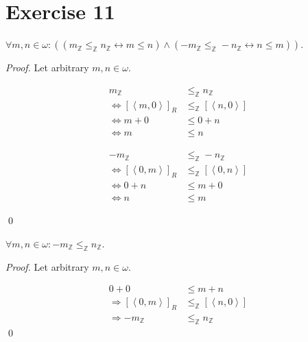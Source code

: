 \documentclass[11pt]{llncs}
\begin{document}
\section*{Exercise 11}
\begin{lemma}
  $\forall m, n \in \omega:
  ((m_{\mathbb{Z}} \leq_{\mathbb{Z}} n_{\mathbb{Z}} \leftrightarrow m \leq n)
   \land
  (-m_{\mathbb{Z}} \leq_{\mathbb{Z}} -n_{\mathbb{Z}} \leftrightarrow n \leq m))$.
\end{lemma}
\begin{proof}
  Let arbitrary $m, n \in \omega$.

  \begin{minipage}[t]{0.49\textwidth}
    \begin{align*}
                      m_{\mathbb{Z}} &\leq_{\mathbb{Z}} n_{\mathbb{Z}}\\
      \Leftrightarrow [\left<m, 0\right>]_R &\leq_{\mathbb{Z}} [\left<n, 0\right>]\\
      \Leftrightarrow m + 0 &\leq 0 + n\\
      \Leftrightarrow m &\leq n
    \end{align*}
  \end{minipage}
  \textwidth
  \vline
  \textwidth
  \begin{minipage}[t]{0.49\textwidth}
    \begin{align*}
                      -m_{\mathbb{Z}} &\leq_{\mathbb{Z}} -n_{\mathbb{Z}}\\
      \Leftrightarrow [\left<0, m\right>]_R &\leq_{\mathbb{Z}} [\left<0, n\right>]\\
      \Leftrightarrow 0 + n &\leq m + 0\\
      \Leftrightarrow n &\leq m
    \end{align*}
  \end{minipage}
  \qed
\end{proof}

\begin{lemma}
  $\forall m, n \in \omega: -m_{\mathbb{Z}} \leq_{\mathbb{Z}} n_{\mathbb{Z}}$.
\end{lemma}
\begin{proof}
  Let arbitrary $m, n \in \omega$.

  \begin{align*}
                    0 + 0 &\leq m + n\\
    \Rightarrow [\left<0, m\right>]_R &\leq_{\mathbb{Z}} [\left<n, 0\right>]\\
    \Rightarrow -m_{\mathbb{Z}} &\leq_{\mathbb{Z}} n_{\mathbb{Z}}
  \end{align*}
  \qed
\end{proof}
\end{document}

